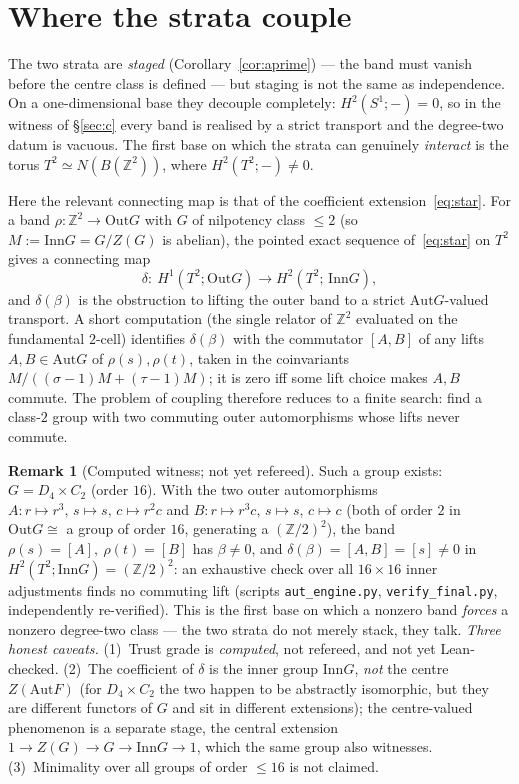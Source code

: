 \documentclass[11pt]{article}
\theoremstyle{definition}
\newtheorem{remark}[theorem]{Remark}
\newcommand{\Z}{\mathbb{Z}}
\newcommand{\Aut}{\mathrm{Aut}}
\newcommand{\Inn}{\mathrm{Inn}}
\newcommand{\Out}{\mathrm{Out}}
\begin{document}
\section{Where the strata couple}\label{sec:couple}

The two strata are \emph{staged} (Corollary~\ref{cor:aprime}) --- the band must vanish before the
centre class is defined --- but staging is not the same as independence. On a one-dimensional base they
decouple completely: $H^2(S^1;-)=0$, so in the witness of \S\ref{sec:c} every band is realised by a
strict transport and the degree-two datum is vacuous. The first base on which the strata can
genuinely \emph{interact} is the torus $T^2\simeq N(B(\Z^2))$, where $H^2(T^2;-)\neq0$.

Here the relevant connecting map is that of the coefficient
extension~\eqref{eq:star}. For a band $\rho:\Z^2\to\Out G$ with $G$ of nilpotency class $\le2$ (so
$M:=\Inn G=G/Z(G)$ is abelian), the pointed exact sequence of~\eqref{eq:star} on $T^2$ gives a
connecting map
\[
\delta:\ H^1(T^2;\Out G)\longrightarrow H^2(T^2;\,\Inn G),
\]
and $\delta(\beta)$ is the obstruction to lifting the outer band to a strict $\Aut G$-valued transport.
A short computation (the single relator of $\Z^2$ evaluated on the fundamental $2$-cell) identifies
$\delta(\beta)$ with the commutator $[A,B]$ of any lifts $A,B\in\Aut G$ of $\rho(s),\rho(t)$, taken in
the coinvariants $M/((\sigma-1)M+(\tau-1)M)$; it is zero iff some lift choice makes $A,B$ commute. The
problem of coupling therefore reduces to a finite search: find a class-$2$ group with two commuting
outer automorphisms whose lifts never commute.

\begin{remark}[Computed witness; not yet refereed]\label{rem:couple}
Such a group exists: $G=D_4\times C_2$ (order $16$). With the two outer automorphisms
$A:r\mapsto r^3,\,s\mapsto s,\,c\mapsto r^2c$ and $B:r\mapsto r^3c,\,s\mapsto s,\,c\mapsto c$ (both
of order $2$ in $\Out G\cong$ a group of order $16$, generating a $(\Z/2)^2$), the band
$\rho(s)=[A],\ \rho(t)=[B]$ has $\beta\neq0$, and $\delta(\beta)=[A,B]=[s]\neq0$ in
$H^2(T^2;\Inn G)=(\Z/2)^2$: an exhaustive check over all $16\times16$ inner adjustments finds no
commuting lift (scripts \texttt{aut\_engine.py}, \texttt{verify\_final.py}, independently
re-verified). This is the first base on which a nonzero band \emph{forces} a nonzero degree-two class
--- the two strata do not merely stack, they talk. \emph{Three honest caveats.} (1)~Trust grade is
\emph{computed}, not refereed, and not yet Lean-checked. (2)~The coefficient of $\delta$ is the inner
group $\Inn G$, \emph{not} the centre $Z(\Aut F)$ (for $D_4\times C_2$ the two happen to be abstractly
isomorphic, but they are different functors of $G$ and sit in different extensions); the
centre-valued phenomenon is a separate stage, the central extension $1\to Z(G)\to G\to\Inn G\to1$,
which the same group also witnesses. (3)~Minimality over all groups of order $\le16$ is not claimed.
\end{remark}
\end{document}

